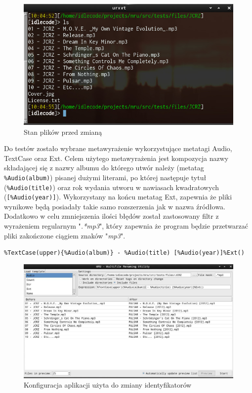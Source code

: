 \begin{figure}[h]
\begin{center}
\includegraphics[scale=0.70]{img/test_before.png}
\end{center}
\caption{Stan plików przed zmianą}
\label{test-before}
\end{figure}

\par
Do testów zostało wybrane metawyrażenie wykorzystujące metatagi Audio, TextCase oraz Ext.
Celem użytego metawyrażenia jest kompozycja nazwy składającej się z nazwy albumu do którego utwór należy (metatag \texttt{\%Audio(album)}) pisanej dużymi literami, po której następuje tytuł (\texttt{\%Audio(title)}) oraz rok wydania utworu w nawiasach kwadratowych (\texttt{[\%Audio(year)]}). Wykorzystany na końcu metatag Ext, zapewnia że pliki wynikowe będą posiadały takie samo rozszerzenia jak w nazwa źródłowa.\\
Dodatkowo w celu zmniejszenia ilości błędów został zastosowany filtr z wyrażeniem regularnym "\textit{.*mp3}", który zapewnia że program będzie przetwarzać pliki zakończone ciągiem znaków "\textit{mp3}".

\begin{center}
\texttt{\%TextCase(upper)\{\%Audio(album)\} - \%Audio(title) [\%Audio(year)]\%Ext()}
\end{center}

\begin{figure}[h]
\begin{center}
\includegraphics[scale=0.45]{img/test_window.png}
\end{center}
\caption{Konfiguracja aplikacji użyta do zmiany identyfikatorów}
\end{figure}

